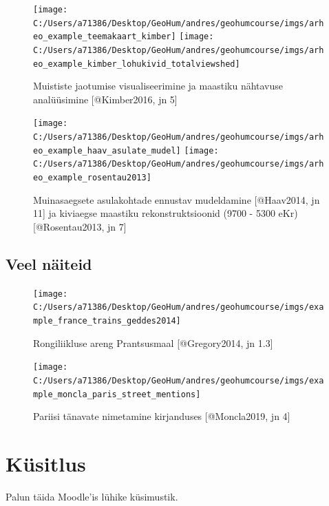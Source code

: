 \documentclass[
]{book}
\begin{document}
\begin{figure}
\texttt{[image: C:/Users/a71386/Desktop/GeoHum/andres/geohumcourse/imgs/arheo\_example\_teemakaart\_kimber]} \texttt{[image: C:/Users/a71386/Desktop/GeoHum/andres/geohumcourse/imgs/arheo\_example\_kimber\_lohukivid\_totalviewshed]} \caption{Muististe jaotumise visualiseerimine  ja maastiku nähtavuse analüüsimine [@Kimber2016, jn 5]}\label{fig:arheo-example}
\end{figure}

\begin{figure}
\texttt{[image: C:/Users/a71386/Desktop/GeoHum/andres/geohumcourse/imgs/arheo\_example\_haav\_asulate\_mudel]} \texttt{[image: C:/Users/a71386/Desktop/GeoHum/andres/geohumcourse/imgs/arheo\_example\_rosentau2013]} \caption{Muinasaegsete asulakohtade ennustav mudeldamine [@Haav2014, jn 11] ja kiviaegse maastiku rekonstruktsioonid (9700 - 5300 eKr) [@Rosentau2013, jn 7]}\label{fig:arheo-example2}
\end{figure}

\hypertarget{veel-nuxe4iteid}{%
\subsection{Veel näiteid}\label{veel-nuxe4iteid}}

\begin{figure}

{\centering \texttt{[image: C:/Users/a71386/Desktop/GeoHum/andres/geohumcourse/imgs/example\_france\_trains\_geddes2014]} 

}

\caption{Rongiliikluse areng Prantsusmaal [@Gregory2014, jn 1.3]}\label{fig:more-examples1}
\end{figure}

\begin{figure}

{\centering \texttt{[image: C:/Users/a71386/Desktop/GeoHum/andres/geohumcourse/imgs/example\_moncla\_paris\_street\_mentions]} 

}

\caption{Pariisi tänavate nimetamine kirjanduses [@Moncla2019, jn 4]}\label{fig:more-examples2}
\end{figure}

\hypertarget{kuxfcsitlus}{%
\section{Küsitlus}\label{kuxfcsitlus}}

Palun täida Moodle'is lühike küsimustik.
\end{document}
